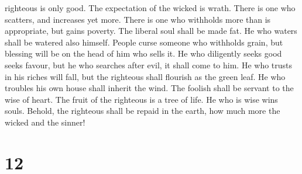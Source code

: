 righteous is only good. The expectation of the wicked is wrath.
 There is one who scatters, and increases yet more. There
is one who withholds more than is appropriate, but gains poverty.
 The liberal soul shall be made fat. He who waters shall be
watered also himself.  People curse someone who withholds
grain, but blessing will be on the head of him who sells it.
 He who diligently seeks good seeks favour, but he who
searches after evil, it shall come to him.  He who trusts
in his riches will fall, but the righteous shall flourish as the green
leaf.  He who troubles his own house shall inherit the
wind. The foolish shall be servant to the wise of heart. 
The fruit of the righteous is a tree of life. He who is wise wins souls.
 Behold, the righteous shall be repaid in the earth, how
much more the wicked and the sinner!

\hypertarget{section-11}{%
\section{12}\label{section-11}}

